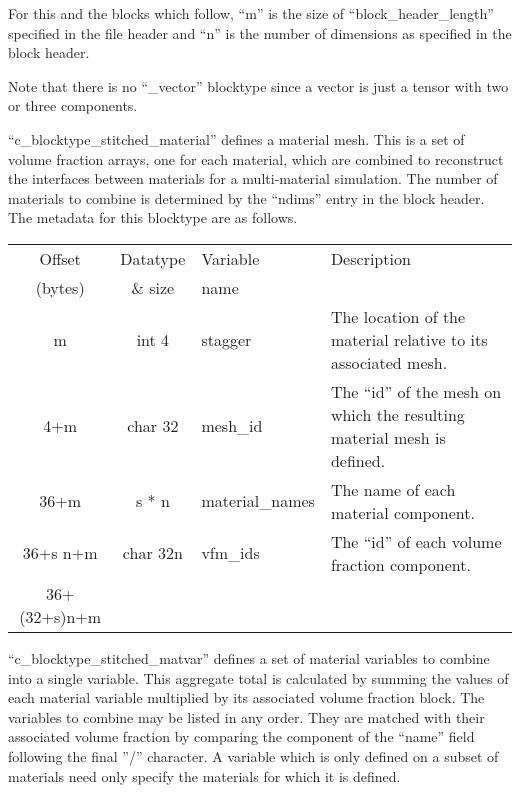 \documentclass[12pt]{article}
\begin{document}
For this and the blocks which follow, ``m'' is the size of
``block\_header\_length'' specified in the file header and
``n'' is the number of dimensions as specified in the block header.

Note that there is no ``\_vector'' blocktype since a vector is just a tensor
with two or three components.

``c\_blocktype\_stitched\_material'' defines a material mesh. This is a
set of volume fraction arrays, one for each material, which are combined to
reconstruct the interfaces between materials for a multi-material simulation.
The number of materials to combine is determined by the ``ndims'' entry in
the block header. The metadata for this blocktype are as follows.\\

\begin{center}
\begin{tabularx}{0.9\textwidth}[!hbt]{cclX}
  Offset & Datatype & Variable & Description\\
  (bytes) & \& size & name &
  \\\toprule

  m & int 4 & stagger & The location of the material relative to its
  associated mesh.
  \\\midrule

  4+m & char 32 & mesh\_id & The ``id'' of the mesh on which the resulting
  material mesh is defined.
  \\\midrule

  36+m & s * n & material\_names & The name of each material component.
  \\\midrule

  36+s n+m & char 32n & vfm\_ids & The ``id'' of each volume fraction component.
  \\\midrule

  36+(32+s)n+m &
\end{tabularx}
\end{center}\vspace{10pt}

``c\_blocktype\_stitched\_matvar'' defines a set of material variables to
combine into a single variable. This aggregate total is calculated by summing
the values of each material variable multiplied by its associated volume
fraction block. The variables to combine may be listed in any order. They
are matched with their associated volume fraction by comparing the
component of the ``name'' field following the final ''/'' character.
A variable which is only defined on a subset of materials need only specify
the materials for which it is defined.
\end{document}
